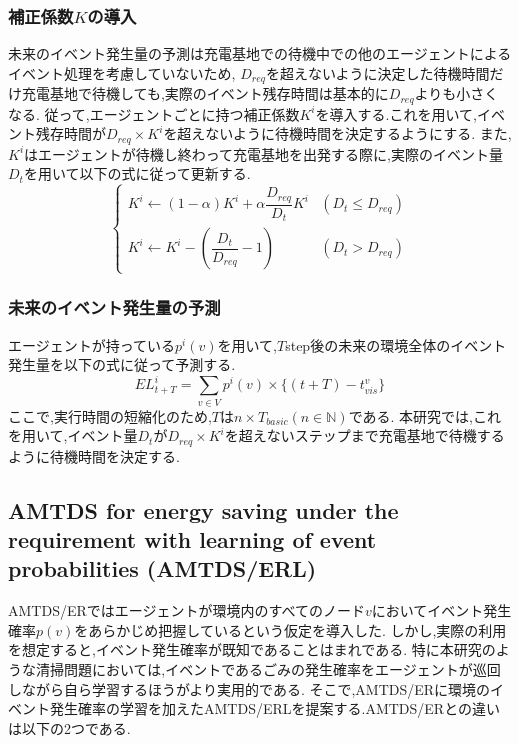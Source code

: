\documentclass[12pt,a4j,twoside]{jarticle}
\begin{document}
  \subsubsection{補正係数$K$の導入}
  未来のイベント発生量の予測は充電基地での待機中での他のエージェントによるイベント処理を考慮していないため,
  $D_{req}$を超えないように決定した待機時間だけ充電基地で待機しても,実際のイベント残存時間は基本的に$D_{req}$よりも小さくなる.
  従って,エージェントごとに持つ補正係数$K^i$を導入する.これを用いて,イベント残存時間が$D_{req} \times K^i$を超えないように待機時間を決定するようにする.
  また,$K^i$はエージェントが待機し終わって充電基地を出発する際に,実際のイベント量$D_t$を用いて以下の式に従って更新する.
  \begin{equation}
    \begin{cases}
      K^i \gets (1 - \alpha)K^i + \alpha\dfrac{D_{req}}{D_t}K^i & (D_{t} \leq D_{req})\\
      K^i \gets K^i - \left( \dfrac{D_{t}}{D_{req}} - 1 \right) & (D_{t} > D_{req})
    \end{cases}
    \label{eq:K^i}
  \end{equation}

  \subsubsection{未来のイベント発生量の予測}
  エージェントが持っている$p^i(v)$を用いて,$T$step後の未来の環境全体のイベント発生量を以下の式に従って予測する.
  \begin{equation}
    EL^i_{t+T} = \sum_{v \in V} p^i(v) \times \{(t+T)-t^v_{vis}\}
  \end{equation}
  ここで,実行時間の短縮化のため,$T$は$n \times T_{basic} (n \in \mathbb{N})$である.
  本研究では,これを用いて,イベント量$D_t$が$D_{req} \times K^i$を超えないステップまで充電基地で待機するように待機時間を決定する.

  \subsection{AMTDS for energy saving under the requirement with learning of  event probabilities (AMTDS/ERL)}
  AMTDS/ERではエージェントが環境内のすべてのノード$v$においてイベント発生確率$p(v)$をあらかじめ把握しているという仮定を導入した.
  しかし,実際の利用を想定すると,イベント発生確率が既知であることはまれである.
  特に本研究のような清掃問題においては,イベントであるごみの発生確率をエージェントが巡回しながら自ら学習するほうがより実用的である.
  そこで,AMTDS/ERに環境のイベント発生確率の学習を加えたAMTDS/ERLを提案する.AMTDS/ERとの違いは以下の2つである.
\end{document}
